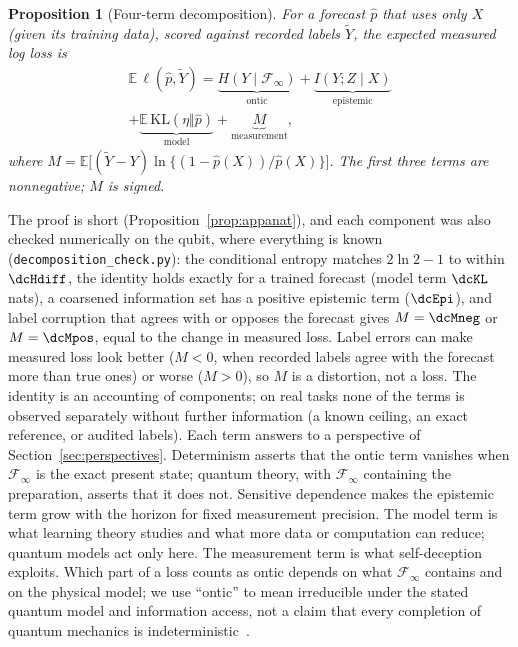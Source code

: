 \documentclass[journal]{IEEEtran}
\newtheorem{proposition}{Proposition}
\theoremstyle{definition}
\newcommand{\E}{\mathbb{E}}
\newcommand{\F}{\mathcal{F}}
\newcommand{\KL}{\mathrm{KL}}
\begin{document}
\begin{proposition}[Four-term decomposition]\label{prop:anat}
For a forecast $\hat p$ that uses only $X$ (given its training data), scored against recorded labels $\tilde Y$, the expected measured log loss is
\begin{multline}\label{eq:anat}
\E\,\ell(\hat p,\tilde Y)=\underbrace{H(Y\mid\F_\infty)}_{\text{ontic}}+\underbrace{I(Y;Z\mid X)}_{\text{epistemic}}\\
+\underbrace{\E\,\KL(\eta\Vert\hat p)}_{\text{model}}+\underbrace{M}_{\text{measurement}},
\end{multline}
where $M=\E\big[(\tilde Y-Y)\ln\{(1-\hat p(X))/\hat p(X)\}\big]$. The first three terms are nonnegative; $M$ is signed.
\end{proposition}
The proof is short (Proposition~\ref{prop:appanat}), and each component was also checked numerically on the qubit, where everything is known (\texttt{decomposition\_check.py}): the conditional entropy matches $2\ln2-1$ to within $\dcHdiff$, the identity holds exactly for a trained forecast (model term $\dcKL$ nats), a coarsened information set has a positive epistemic term ($\dcEpi$), and label corruption that agrees with or opposes the forecast gives $M=\dcMneg$ or $M=\dcMpos$, equal to the change in measured loss. Label errors can make measured loss look better ($M<0$, when recorded labels agree with the forecast more than true ones) or worse ($M>0$), so $M$ is a distortion, not a loss. The identity is an accounting of components; on real tasks none of the terms is observed separately without further information (a known ceiling, an exact reference, or audited labels). Each term answers to a perspective of Section~\ref{sec:perspectives}. Determinism asserts that the ontic term vanishes when $\F_\infty$ is the exact present state; quantum theory, with $\F_\infty$ containing the preparation, asserts that it does not. Sensitive dependence makes the epistemic term grow with the horizon for fixed measurement precision. The model term is what learning theory studies and what more data or computation can reduce; quantum models act only here. The measurement term is what self-deception exploits. Which part of a loss counts as ontic depends on what $\F_\infty$ contains and on the physical model; we use ``ontic'' to mean irreducible under the stated quantum model and information access, not a claim that every completion of quantum mechanics is indeterministic~\cite{norsen2011local}.
\end{document}
